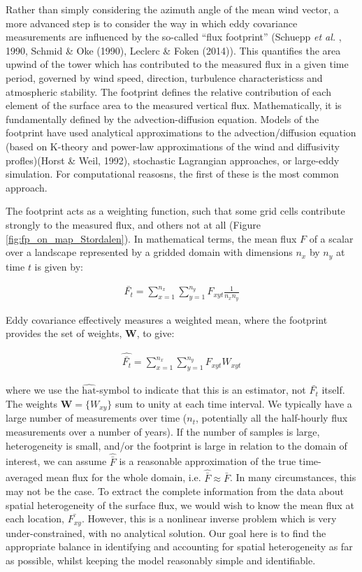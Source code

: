 Rather than simply considering the azimuth angle of the mean wind
vector, a more advanced step is to consider the way in which eddy
covariance measurements are influenced by the so-called ``flux
footprint'' (Schuepp \emph{et al.} , 1990, Schmid \& Oke (1990), Leclerc
\& Foken (2014)). This quantifies the area upwind of the tower which has
contributed to the measured flux in a given time period, governed by
wind speed, direction, turbulence characteristicss and atmospheric
stability. The footprint defines the relative contribution of each
element of the surface area to the measured vertical flux.
Mathematically, it is fundamentally defined by the advection-diffusion
equation. Models of the footprint have used analytical approximations to
the advection/diffusion equation (based on K-theory and power-law
approximations of the wind and diffusivity profles)(Horst \& Weil,
1992), stochastic Lagrangian approaches, or large-eddy simulation. For
computational reasosns, the first of these is the most common approach.

The footprint acts as a weighting function, such that some grid cells
contribute strongly to the measured flux, and others not at all (Figure
\ref{fig:fp_on_map_Stordalen}). In mathematical terms, the mean flux
\(F\) of a scalar over a landscape represented by a gridded domain with
dimensions \(n_x\) by \(n_y\) at time \(t\) is given by:

\begin{align}
   \label{eq:simpleMean} 
  \bar{F_t} = \sum_{x = 1}^{n_x} \sum_{y = 1}^{n_y} F_{xyt} \frac{1}{n_x n_y}

\end{align}

Eddy covariance effectively measures a weighted mean, where the
footprint provides the set of weights, \(\mathbf{W}\), to give:

\begin{align}
   \label{eq:weightMean} 
  \widehat{\bar{F_t}} = \sum_{x = 1}^{n_x} \sum_{y = 1}^{n_y} F_{xyt} W_{xyt}

\end{align}

where we use the \(\widehat{\mathrm{hat}}\)-symbol to indicate that this
is an estimator, not \(\bar{F_t}\) itself. The weights
\(\mathbf{W} = \{W_{xy}\}\) sum to unity at each time interval. We
typically have a large number of measurements over time (\(n_t\),
potentially all the half-hourly flux measurements over a number of
years). If the number of samples is large, heterogeneity is small,
and/or the footprint is large in relation to the domain of interest, we
can assume \(\widehat{\bar{F}}\) is a reasonable approximation of the
true time-averaged mean flux for the whole domain, i.e.
\(\widehat{\bar{F}} \approx \bar{F}\). In many circumstances, this may
not be the case. To extract the complete information from the data about
spatial heterogeneity of the surface flux, we would wish to know the
mean flux at each location, \(\bar{F_{xy}}\). However, this is a
nonlinear inverse problem which is very under-constrained, with no
analytical solution. Our goal here is to find the appropriate balance in
identifying and accounting for spatial heterogeneity as far as possible,
whilst keeping the model reasonably simple and identifiable.

